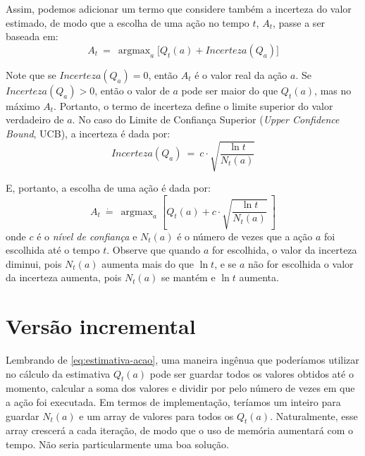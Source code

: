 \documentclass{article}
\DeclareMathOperator*{\argmax}{argmax}
\begin{document}
            Assim, podemos adicionar um termo que considere também a incerteza do valor estimado, de modo que a escolha de uma ação no tempo $t$, $A_t$, passe a ser baseada em:            
            \begin{equation}
                A_t \ = \ \argmax_a \Big[ Q_t(a) + Incerteza(Q_a) \Big]
            \end{equation}           
            
            Note que se $Incerteza(Q_a) = 0$, então $A_t$ é o valor real da ação $a$. Se $Incerteza(Q_a) > 0$, então o valor de $a$ pode ser maior do que $Q_t(a)$, mas no máximo $A_t$. Portanto, o termo de incerteza define o limite superior do valor verdadeiro de $a$. No caso do Limite de Confiança Superior (\emph{Upper Confidence Bound}, UCB), a incerteza é dada por:            
            \begin{equation}
                Incerteza(Q_a) \ = \ c \cdot \sqrt{\frac{\ln{t}}{N_t(a)}}
            \end{equation}
            
            E, portanto, a escolha de uma ação é dada por:            
            \begin{equation}
                A_t \ \dot{=} \ \argmax_a \left[ Q_t(a) + c \cdot \sqrt{\frac{\ln{t}}{N_t(a)}} \ \right]
            \end{equation}            
            \noindent
            onde $c$ é o \emph{nível de confiança} e $N_t(a)$ é o número de vezes que a ação $a$ foi escolhida até o tempo $t$. Observe que quando $a$ for escolhida, o valor da incerteza diminui, pois $N_t(a)$ aumenta mais do que $\ln{t}$, e se $a$ não for escolhida o valor da incerteza aumenta, pois $N_t(a)$ se mantém e $\ln{t}$ aumenta.
            
    \section{Versão incremental}

        Lembrando de \eqref{eq:estimativa-acao}, uma maneira ingênua que poderíamos utilizar no cálculo da estimativa $Q_t(a)$ pode ser guardar todos os valores obtidos até o momento, calcular a soma dos valores e dividir por pelo número de vezes em que a ação foi executada. Em termos de implementação, teríamos um inteiro para guardar $N_t(a)$ e um array de valores para todos os $Q_t(a)$. Naturalmente, esse array crescerá a cada iteração, de modo que o uso de memória aumentará com o tempo. Não seria particularmente uma boa solução.
        
\end{document}
